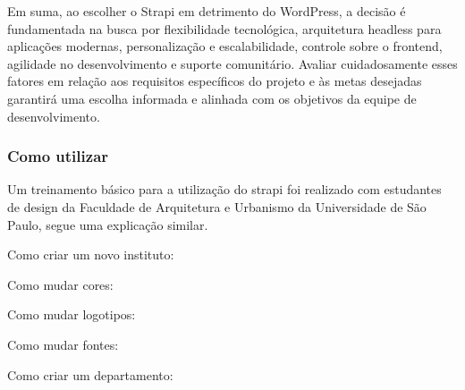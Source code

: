 \documentclass[12pt,twoside,english,brazilian]{article}
\begin{document}
Em suma, ao escolher o Strapi em detrimento do WordPress, a decisão é fundamentada na busca por flexibilidade tecnológica, arquitetura headless para aplicações modernas, personalização e escalabilidade, controle sobre o frontend, agilidade no desenvolvimento e suporte comunitário. Avaliar cuidadosamente esses fatores em relação aos requisitos específicos do projeto e às metas desejadas garantirá uma escolha informada e alinhada com os objetivos da equipe de desenvolvimento.
\subsubsection{Como utilizar}
Um treinamento básico para a utilização do strapi foi realizado com estudantes de design da Faculdade de Arquitetura e Urbanismo da Universidade de São Paulo, segue uma explicação similar.

Como criar um novo instituto:

Como mudar cores:

Como mudar logotipos:

Como mudar fontes: 

Como criar um departamento:
\end{document}
